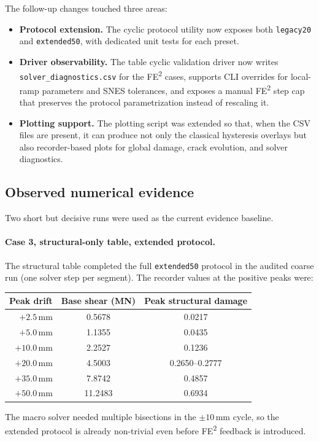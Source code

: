 The follow-up changes touched three areas:
\begin{itemize}
  \item \textbf{Protocol extension.}  The cyclic protocol utility now exposes
    both \texttt{legacy20} and \texttt{extended50}, with dedicated unit tests
    for each preset.
  \item \textbf{Driver observability.}  The table cyclic validation driver now
    writes \texttt{solver\_diagnostics.csv} for the FE\textsuperscript{2}
    cases, supports CLI overrides for local-ramp parameters and SNES tolerances,
    and exposes a manual FE\textsuperscript{2} step cap that preserves the
    protocol parametrization instead of rescaling it.
  \item \textbf{Plotting support.}  The plotting script was extended so that,
    when the CSV files are present, it can produce not only the classical
    hysteresis overlays but also recorder-based plots for global damage, crack
    evolution, and solver diagnostics.
\end{itemize}

\subsection{Observed numerical evidence}

Two short but decisive runs were used as the current evidence baseline.

\paragraph{Case 3, structural-only table, extended protocol.}
The structural table completed the full \texttt{extended50} protocol in the
audited coarse run (one solver step per segment).  The recorder values at the
positive peaks were:
\begin{center}
\begin{tabular}{rcc}
\toprule
Peak drift & Base shear (MN) & Peak structural damage \\
\midrule
\(+2.5\)\,mm & 0.5678 & 0.0217 \\
\(+5.0\)\,mm & 1.1355 & 0.0435 \\
\(+10.0\)\,mm & 2.2527 & 0.1236 \\
\(+20.0\)\,mm & 4.5003 & 0.2650--0.2777 \\
\(+35.0\)\,mm & 7.8742 & 0.4857 \\
\(+50.0\)\,mm & 11.2483 & 0.6934 \\
\bottomrule
\end{tabular}
\end{center}
The macro solver needed multiple bisections in the \(\pm 10\)\,mm cycle, so
the extended protocol is already non-trivial even before FE\textsuperscript{2}
feedback is introduced.

